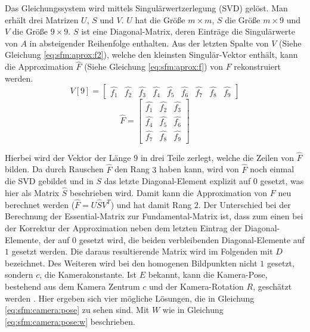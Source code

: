 \documentclass[12pt,titlepage, twoside]{article}
\begin{document}
Das Gleichungssystem wird mittels Singulärwertzerlegung (SVD) gelöst. Man erhält drei Matrizen $U$, $S$ und $V$. $U$ hat die Größe $m\times m$, $S$ die Größe $m\times 9$ und $V$ die Größe $9\times 9$.
$S$ ist eine Diagonal-Matrix, deren Einträge die Singulärwerte von $A$ in absteigender Reihenfolge enthalten.
Aus der letzten Spalte von $V$ (Siehe Gleichung \ref{eq:sfm:aprox:f2}), welche den kleinsten Singulär-Vektor enthält, kann die Approximation $\hat{F}$ (Siehe Gleichung \ref{eq:sfm:aprox:f}) von $F$ rekonstruiert werden. 
\begin{equation}
    \label{eq:sfm:aprox:f2}
    V[9] = \begin{bmatrix}
        \hat{f_1} & \hat{f_2} & \hat{f_3} & \hat{f_4} & \hat{f_5} & \hat{f_6} & \hat{f_7} & \hat{f_8} & \hat{f_9}
    \end{bmatrix}
\end{equation}
\begin{equation}
    \label{eq:sfm:aprox:f}
    \hat{F}=\begin{bmatrix}
        \hat{f_1} & \hat{f_2} & \hat{f_3}\\
        \hat{f_4} & \hat{f_5} & \hat{f_6}\\
        \hat{f_7} & \hat{f_8} & \hat{f_9}
    \end{bmatrix}
\end{equation}

Hierbei wird der Vektor der Länge $9$ in drei Teile zerlegt, welche die Zeilen von $\hat{F}$ bilden. 
Da durch Rauschen $\hat{F}$ den Rang $3$ haben kann, wird von $\hat{F}$ noch einmal die SVD gebildet und in $S$ das letzte Diagonal-Element explizit auf $0$ gesetzt, was hier als Matrix $\hat{S}$ beschrieben wird.
Damit kann die Approximation von $F$ neu berechnet werden ($\hat{F} = U\hat{S}V^T$) und hat damit Rang $2$.
Der Unterschied bei der Berechnung der Essential-Matrix zur Fundamental-Matrix ist, dass zum einen bei der Korrektur der Approximation neben dem letzten Eintrag der Diagonal-Elemente, der auf $0$ gesetzt wird, 
die beiden verbleibenden Diagonal-Elemente auf $1$ gesetzt werden. Die daraus resultierende Matrix wird im Folgenden mit $D$ bezeichnet. 
Des Weiteren wird bei den homogenen Bildpunkten nicht $1$ gesetzt, sondern $c$, die Kamerakonstante.
Ist $E$ bekannt, kann die Kamera-Pose, bestehend aus dem Kamera Zentrum $c$ und der Kamera-Rotation $R$, geschätzt werden \cite{sfm2}.
Hier ergeben sich vier mögliche Lösungen, die in Gleichung \ref{eq:sfm:camera:pose} zu sehen sind. Mit $W$ wie in Gleichung \ref{eq:sfm:camera:pose:w} beschrieben.
\end{document}
